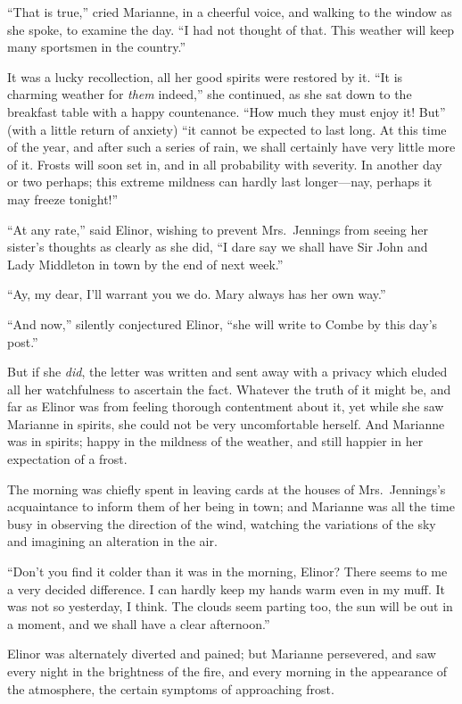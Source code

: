 \documentclass{article}
\begin{document}
``That is true,'' cried Marianne, in a cheerful voice,
and walking to the window as she spoke, to examine the day.
``I had not thought of that.  This weather will keep many
sportsmen in the country.''

It was a lucky recollection, all her good spirits were
restored by it.  ``It is charming weather for \emph{them} indeed,''
she continued, as she sat down to the breakfast table
with a happy countenance.  ``How much they must enjoy
it! But'' (with a little return of anxiety) ``it cannot
be expected to last long.  At this time of the year,
and after such a series of rain, we shall certainly
have very little more of it.  Frosts will soon set in,
and in all probability with severity.  In another day
or two perhaps; this extreme mildness can hardly last
longer---nay, perhaps it may freeze tonight!''

``At any rate,'' said Elinor, wishing to prevent
Mrs.\ Jennings from seeing her sister's thoughts as clearly
as she did, ``I dare say we shall have Sir John and Lady
Middleton in town by the end of next week.''

``Ay, my dear, I'll warrant you we do.  Mary always
has her own way.''

``And now,'' silently conjectured Elinor, ``she will
write to Combe by this day's post.''

But if she \emph{did}, the letter was written and sent away
with a privacy which eluded all her watchfulness to ascertain
the fact.  Whatever the truth of it might be, and far
as Elinor was from feeling thorough contentment about it,
yet while she saw Marianne in spirits, she could not be
very uncomfortable herself.  And Marianne was in spirits;
happy in the mildness of the weather, and still happier
in her expectation of a frost.

The morning was chiefly spent in leaving cards at
the houses of Mrs.\ Jennings's acquaintance to inform
them of her being in town; and Marianne was all the time
busy in observing the direction of the wind, watching the
variations of the sky and imagining an alteration in the air.

``Don't you find it colder than it was in the morning,
Elinor? There seems to me a very decided difference.
I can hardly keep my hands warm even in my muff.  It was
not so yesterday, I think.  The clouds seem parting too,
the sun will be out in a moment, and we shall have a
clear afternoon.''

Elinor was alternately diverted and pained;
but Marianne persevered, and saw every night in the
brightness of the fire, and every morning in the appearance
of the atmosphere, the certain symptoms of approaching frost.
\end{document}
